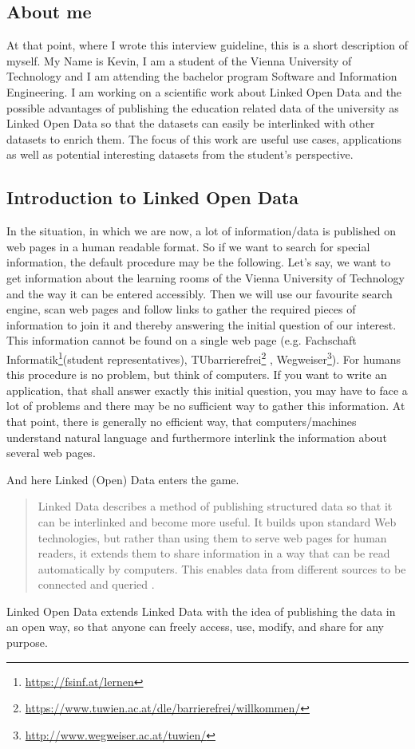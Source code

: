 \documentclass{article}
\begin{document}
\subsection{About me}
\label{questionaire:about-me}
At that point, where I wrote this interview guideline, this is a short description of myself. My Name is Kevin, I am a student of the Vienna University of Technology and I am attending the bachelor program Software and Information Engineering. I am working on a scientific work about Linked Open Data and the possible advantages of publishing the education related data of the university as Linked Open Data so that the datasets can easily be interlinked with other datasets to enrich them. The focus of this work are useful use cases, applications as well as potential interesting datasets from the student’s perspective.

\subsection{Introduction to Linked Open Data}
\label{questionaire:lod-intro}
In the situation, in which we are now, a lot of information/data is published on web pages in a human readable format. So if we want to search for special information, the default procedure may be the following. Let’s say, we want to get information about the learning rooms of the Vienna University of Technology and the way it can be entered accessibly. Then we will use our favourite search engine, scan web pages and follow links to gather the required pieces of information to join it and thereby answering the initial question of our interest. This information cannot be found on a single web page (e.g. Fachschaft Informatik\footnote{\url{https://fsinf.at/lernen}}(student representatives), TUbarrierefrei\footnote{\url{https://www.tuwien.ac.at/dle/barrierefrei/willkommen/}} , Wegweiser\footnote{\url{http://www.wegweiser.ac.at/tuwien/}}). For humans this procedure is no problem, but think of computers. If you want to write an application, that shall answer exactly this initial question, you may have to face a lot of problems and there may be no sufficient way to gather this information. At that point, there is generally no efficient way, that computers/machines understand natural language and furthermore interlink the information about several web pages.

And here Linked (Open) Data enters the game.\begin{quote} Linked Data describes a method of publishing structured data so that it can be interlinked and become more useful. It builds upon standard Web technologies, but rather than using them to serve web pages for human readers, it extends them to share information in a way that can be read automatically by computers. This enables data from different sources to be connected and queried
\cite{bizer_linked_2009}.\end{quote} Linked Open Data extends Linked Data with the idea of publishing the data in an open way, so that anyone can freely access, use, modify, and share for any purpose.
\end{document}
